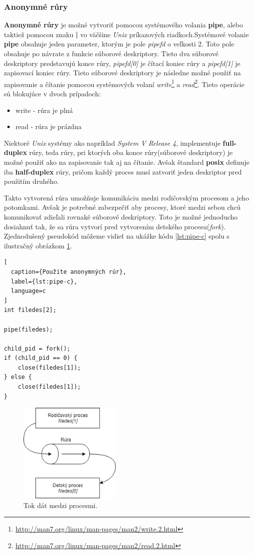 \subsubsection{Anonymné rúry}
\textbf{Anonymné rúry} je možné vytvoriť pomocou systémového volania \textbf{pipe}, alebo taktiež pomocou znaku \textbf{|} vo väčšine \textit{Unix} príkazových riadkoch.Systémové volanie \textbf{pipe} obsahuje jeden parameter, ktorým je pole \textit{pipefd} o veľkosti 2. Toto pole obsahuje po návrate z funkcie súborové deskriptory. Tieto dva súborové deskriptory predstavujú konce rúry, \textit{pipefd[0]} je čítací koniec rúry a \textit{pipefd[1]} je zapisovací koniec rúry. Tieto súborové deskriptory je následne možné použiť na zapisovanie a čítanie pomocou systémových volaní \textit{write}\footnote{\url{http://man7.org/linux/man-pages/man2/write.2.html}} a \textit{read}\footnote{\url{http://man7.org/linux/man-pages/man2/read.2.html}}. Tieto operácie sú blokujúce v dvoch prípadoch:
\begin{itemize}
\item write - rúra je plná
\item read - rúra je prázdna
\end{itemize}
Niektoré \textit{Unix} systémy ako napríklad \textit{System V Release 4}, implementuje \textbf{full-duplex} rúry, teda rúry, pri ktorých oba konce rúry(súborové deskriptory) je možné použiť ako na zapisovanie tak aj na čítanie. Avšak štandard \textbf{\acrshort{posix}} definuje iba \textbf{half-duplex} rúry, pričom každý proces musí zatvoriť jeden deskriptor pred použitím druhého.\cite{linux}

Takto vytvorená rúra umožňuje komunikáciu medzi rodičovským procesom a jeho potomkami. Avšak je potrebné zabezpečiť aby procesy, ktoré medzi sebou chcú komunikovať zdieľali rovnaké súborové deskriptory. Toto je možné jednoducho dosiahnuť tak, že sa rúra vytvorí pred vytvorením detského procesu(\textit{fork}). Zjednodušený pseudokód môžeme vidieť na ukážke kódu \ref{lst:pipe-c} spolu s ilustračný obrázkom \ref{pipeflow}.\cite{overview}
\begin{lstlisting}[
  caption={Použite anonymných rúr},
  label={lst:pipe-c},
  language=c
]
int filedes[2];

pipe(filedes);

child_pid = fork();
if (child_pid == 0) {
	close(filedes[1]);
} else {
	close(filedes[1]);
}
\end{lstlisting}
\begin{figure}[!htbp]
  \centering
  \includegraphics[width=5cm]{img/rura.png}
  \caption{Tok dát medzi procesmi.}
  \label{pipeflow}
\end{figure}

